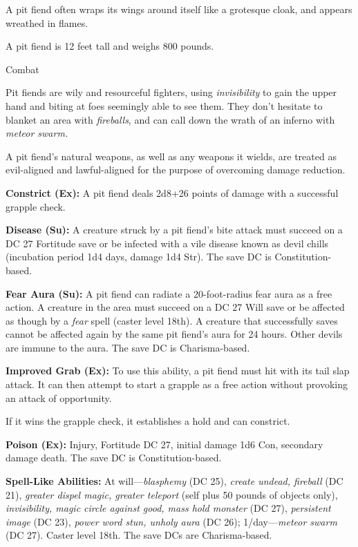 \documentclass{article}
\begin{document}
A pit fiend often wraps its wings around itself like a grotesque cloak, and appears 
wreathed in flames.

A pit fiend is 12 feet tall and weighs 800 pounds.

Combat

Pit fiends are wily and resourceful fighters, using \textit{invisibility }to gain 
the upper hand and biting at foes seemingly able to see them. They don't hesitate 
to blanket an area with \textit{fireballs}, and can call down the wrath of an inferno 
with \textit{meteor swarm.}

A pit fiend's natural weapons, as well as any weapons it wields, are treated as 
evil-aligned and lawful-aligned for the purpose of overcoming damage reduction.

\textbf{Constrict (Ex): }A pit fiend deals 2d8+26 points of damage with a successful 
grapple check.

\textbf{Disease (Su):} A creature struck by a pit fiend's bite attack must succeed 
on a DC 27 Fortitude save or be infected with a vile disease known as devil chills 
(incubation period 1d4 days, damage 1d4 Str). The save DC is Constitution-based.

\textbf{Fear Aura (Su): }A pit fiend can radiate a 20-foot-radius fear aura as 
a free action. A creature in the area must succeed on a DC 27 Will save or be affected 
as though by a \textit{fear }spell (caster level 18th). A creature that successfully 
saves cannot be affected again by the same pit fiend's aura for 24 hours. Other 
devils are immune to the aura. The save DC is Charisma-based.

\textbf{Improved Grab (Ex):} To use this ability, a pit fiend must hit with its 
tail slap attack. It can then attempt to start a grapple as a free action without 
provoking an attack of opportunity.

If it wins the grapple check, it establishes a hold and can constrict.

\textbf{Poison (Ex): }Injury, Fortitude DC 27, initial damage 1d6 Con, secondary 
damage death. The save DC is Constitution-based.

\textbf{Spell-Like Abilities:} At will---\textit{blasphemy }(DC 25), \textit{create 
undead, fireball }(DC 21), \textit{greater dispel magic, greater teleport }(self 
plus 50 pounds of objects only), \textit{invisibility, magic circle against good, 
mass hold monster }(DC 27), \textit{persistent image }(DC 23), \textit{power word 
stun, unholy aura }(DC 26); 1/day---\textit{meteor swarm }(DC 27). Caster level 
18th. The save DCs are Charisma-based.
\end{document}
